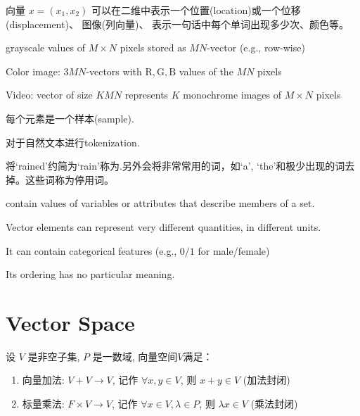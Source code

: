 向量 \( x=\left(x_{1}, x_{2}\right) \) 可以在二维中表示一个位置(location)或一个位移(displacement)、 图像(列向量)、 表示一句话中每个单词出现多少次、颜色等。 

\begin{example}
    grayscale values of $ M \times N $ pixels stored as $ M N $-vector (e.g., row-wise)

    Color image: $ 3 M N $-vectors with $ \mathrm{R}, \mathrm{G}, \mathrm{B} $ values of the $ M N $ pixels

    Video: vector of size $ K M N $ represents $ K $ monochrome images of $ M \times N $ pixels
\end{example}

\begin{example}[时间序列]
    每个元素是一个样本(sample).
\end{example}

\begin{example}[自然文本进行tokenization]
    对于自然文本进行tokenization.

    将`rained'约简为`rain'称为.另外会将非常常用的词，如`a', `the'和极少出现的词去掉。这些词称为停用词。
\end{example}

\begin{example}
    contain values of variables or attributes that describe members of a set.
\end{example}

\begin{remark}
    Vector elements can represent very different quantities, in different units.
\end{remark}

\begin{remark}
    It can contain categorical features (e.g., $0/1$ for male/female)
\end{remark}

\begin{remark}
    Its ordering has no particular meaning.
\end{remark}

\section{Vector Space}

\begin{definition}[向量空间$V$]
    设 \( V \) 是非空子集, \( P \) 是一数域, 向量空间$V$满足：

    \begin{enumerate}
        \item 向量加法: \( V+V \rightarrow V \), 记作 \( \forall x, y \in V \), 则 \( x+y \in V \) (加法封闭)
        \item 标量乘法: \( F \times V \rightarrow V \), 记作 \( \forall x \in V, \lambda \in P \), 则 \( \lambda x \in V \) (乘法封闭)
    \end{enumerate}


\end{definition}

